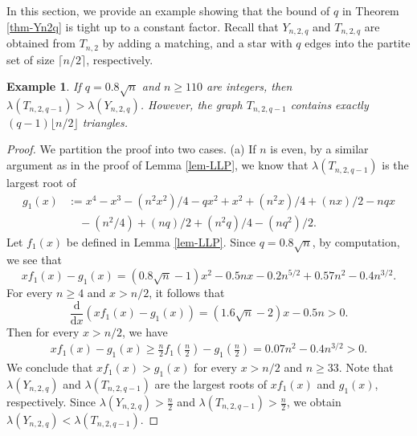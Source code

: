 \documentclass[11pt]{article}
\newtheorem{example}[theorem]{Example}
\begin{document}
In this section, we provide an example showing that the bound of $q$ in Theorem \ref{thm-Yn2q} is tight up to a constant factor. 
Recall that $Y_{n,2,q}$ and $T_{n,2,q}$ are obtained from $T_{n,2}$ by adding a matching, and a star with $q$ edges into the partite set of size $\lceil n/2\rceil$, respectively.  

\begin{example} \label{exam}
If $q=0.8\sqrt{n}$ and $n\ge 110$ are integers, then $  \lambda (T_{n,2,q-1}) > \lambda (Y_{n,2,q})$. 
However, the graph $T_{n,2,q-1}$ contains exactly $(q-1)\lfloor n/2 \rfloor$ triangles. 
\end{example}

\begin{proof} 
We partition the proof into two cases. 
(a) If $n$ is even, by a similar argument as in the proof of Lemma \ref{lem-LLP}, we know that $\lambda (T_{n,2,q-1})$ is the largest root of 
\begin{align*}
 g_1(x)&:= x^4 - x^3  - (n^2 x^2)/4 - q x^2 + x^2 + (n^2 x)/4 + (n x)/2  - n q x \\ 
&\quad -(n^2/4) + (n q)/2 + (n^2 q)/4 - (n q^2)/2   .  
\end{align*}
Let $f_1(x)$ be defined in Lemma \ref{lem-LLP}. 
Since $q=0.8 \sqrt{n}$, by computation, we see that 
\[ x f_1(x) - g_1(x) =  ( 0.8 \sqrt{n} -1) x^2 - 0.5 n x
  - 0.2 n^{5/2} + 0.57 n^2 - 0.4 n^{3/2} . \]
For every $n\ge 4$ and $x> {n}/{2}$, it follows that 
\[  \frac{\mathrm{d}}{\mathrm{d} x}(xf_1(x) - g_1(x)) =  (1.6 \sqrt{n} -2) x -0.5 n  >0. \] 
Then for every $x> n/2$, we have 
\begin{align*}
  x f_1(x) - g_1(x) \ge \tfrac{n}{2}f_1(\tfrac{n}{2}) - g_1(\tfrac{n}{2})  
  =0.07 n^2  -0.4 n^{3/2}  >0. 
  \end{align*}
 We conclude that $xf_1(x) > g_1(x)$ for every $x> n/2$ and $n\ge 33$. 
 Note that $\lambda (Y_{n,2,q})$ and $\lambda (T_{n,2,q-1})$ are the largest roots of $xf_1(x)$ and $g_1(x)$, respectively. 
Since $\lambda (Y_{n,2,q}) > \frac{n}{2}$ and $\lambda (T_{n,2,q-1})> \frac{n}{2}$, we obtain $\lambda (Y_{n,2,q}) < \lambda (T_{n,2,q-1})$. 


\end{proof}
\end{document}
